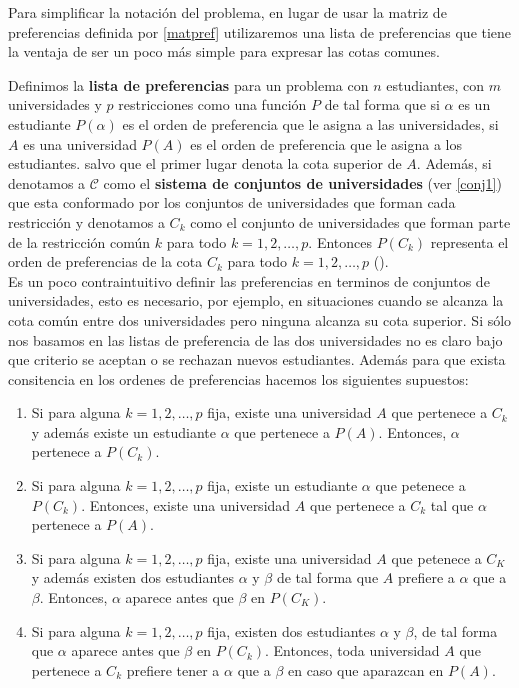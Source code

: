 Para simplificar la notación del problema, en lugar de usar la matriz de preferencias definida por \ref{matpref} utilizaremos una lista de preferencias que tiene la ventaja de ser un poco más simple para expresar las cotas comunes. 

\begin{dfn}
\label{listpref}
Definimos la \textbf{lista de preferencias} para un problema con $n$ estudiantes, con $m$ universidades y $p$ restricciones
como una función $P$ de tal forma que si $\alpha$ es un estudiante $P(\alpha)$ es el orden de preferencia que le asigna a las universidades,
si $A$ es una universidad $P(A)$ es el orden de preferencia que le asigna a los estudiantes. salvo que el primer lugar denota la cota superior de $A$.
Además, si denotamos a $\mathcal{C}$ como el \textbf{sistema de conjuntos de universidades} (ver \ref{conj1}) que esta conformado por los conjuntos de universidades que forman cada restricción y denotamos a $C_k$ como el conjunto de universidades que forman parte de la restricción común $k$ para todo $k=1,2,\dots,p$.
Entonces $P(C_k)$ representa el orden de preferencias de la cota $C_k$ para todo $k=1,2,\dots,p$ ().
\\ Es un poco contraintuitivo definir las preferencias en terminos de conjuntos de universidades, esto es necesario, por ejemplo, en situaciones cuando se alcanza la cota común entre dos universidades pero ninguna alcanza su cota superior. Si sólo nos basamos en las listas de preferencia de las dos universidades no es claro bajo que criterio se aceptan o se rechazan nuevos estudiantes. Además para que exista consitencia en los ordenes de preferencias hacemos los siguientes supuestos:
\begin{enumerate}
\item Si para alguna $k=1,2,\dots,p$ fija, existe una universidad $A$ que pertenece a $C_k$ y además existe un estudiante $\alpha$ que pertenece a $P(A)$. Entonces, $\alpha$ pertenece a $P(C_k)$.
\item Si para alguna $k=1,2,\dots,p$ fija, existe un estudiante $\alpha$ que petenece a $P(C_k)$. Entonces, existe una universidad $A$ que pertenece a $C_k$ tal que $\alpha$ pertenece a $P(A)$.
\item Si para alguna $k=1,2,\dots,p$ fija, existe una universidad $A$ que petenece a $C_K$ y además existen dos estudiantes $\alpha$ y $\beta$ de tal forma que $A$ prefiere a $\alpha$ que a $\beta$. Entonces, $\alpha$ aparece antes que $\beta$ en $P(C_K)$.
\item Si para alguna $k=1,2,\dots,p$ fija, existen dos estudiantes $\alpha$ y $\beta$, de tal forma que $\alpha$ aparece antes que $\beta$ en $P(C_k)$. Entonces, toda universidad $A$ que pertenece a $C_k$ prefiere tener a $\alpha$ que a $\beta$ en caso que aparazcan en $P(A)$.
\end{enumerate}
 \end{dfn}

